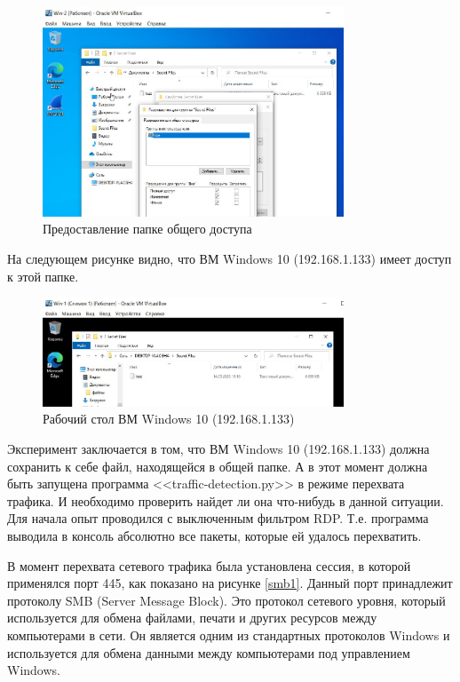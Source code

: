 \documentclass[bachelor, och, coursework]{SCWorks}
\begin{document}
\begin{figure}[H]
  \centering
  \includegraphics[width=0.8\textwidth]{photo/smb-win1.jpg}
  \caption{Предоставление папке общего доступа}
  \label{smb-win1}
\end{figure}

На следующем рисунке видно, что ВМ Windows 10 (192.168.1.133) имеет доступ к этой папке.

\begin{figure}[H]
  \centering
  \includegraphics[width=0.8\textwidth]{photo/smb-win2.jpg}
  \caption{Рабочий стол ВМ Windows 10 (192.168.1.133)}
  \label{smb-win2}
\end{figure}

Эксперимент заключается в том, что ВМ Windows 10 (192.168.1.133) должна сохранить к себе файл, находящейся в общей папке.
А в этот момент должна быть запущена программа <<traffic-detection.py>> в режиме перехвата трафика. И необходимо проверить
найдет ли она что-нибудь в данной ситуации. Для начала опыт проводился с выключенным фильтром RDP. Т.е. программа выводила в
консоль абсолютно все пакеты, которые ей удалось перехватить.

В момент перехвата сетевого трафика была установлена сессия, в которой применялся порт 445, как показано на рисунке \ref{smb1}.
Данный порт принадлежит протоколу SMB (Server Message Block). Это протокол сетевого уровня, который используется для обмена 
файлами, печати и других ресурсов между компьютерами в сети. Он является одним из стандартных протоколов Windows и используется 
для обмена данными между компьютерами под управлением Windows.
\end{document}
